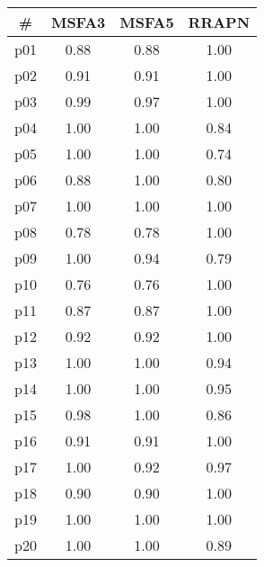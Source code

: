 \begin{tabular}{cccc}
\toprule
\textbf{\#} & \textbf{MSFA3} & \textbf{MSFA5} & \textbf{RRAPN}\\
\midrule
p01 & 0.88 & 0.88 & 1.00\\
p02 & 0.91 & 0.91 & 1.00\\
p03 & 0.99 & 0.97 & 1.00\\
p04 & 1.00 & 1.00 & 0.84\\
p05 & 1.00 & 1.00 & 0.74\\
p06 & 0.88 & 1.00 & 0.80\\
p07 & 1.00 & 1.00 & 1.00\\
p08 & 0.78 & 0.78 & 1.00\\
p09 & 1.00 & 0.94 & 0.79\\
p10 & 0.76 & 0.76 & 1.00\\
p11 & 0.87 & 0.87 & 1.00\\
p12 & 0.92 & 0.92 & 1.00\\
p13 & 1.00 & 1.00 & 0.94\\
p14 & 1.00 & 1.00 & 0.95\\
p15 & 0.98 & 1.00 & 0.86\\
p16 & 0.91 & 0.91 & 1.00\\
p17 & 1.00 & 0.92 & 0.97\\
p18 & 0.90 & 0.90 & 1.00\\
p19 & 1.00 & 1.00 & 1.00\\
p20 & 1.00 & 1.00 & 0.89\\
\bottomrule
\end{tabular}

